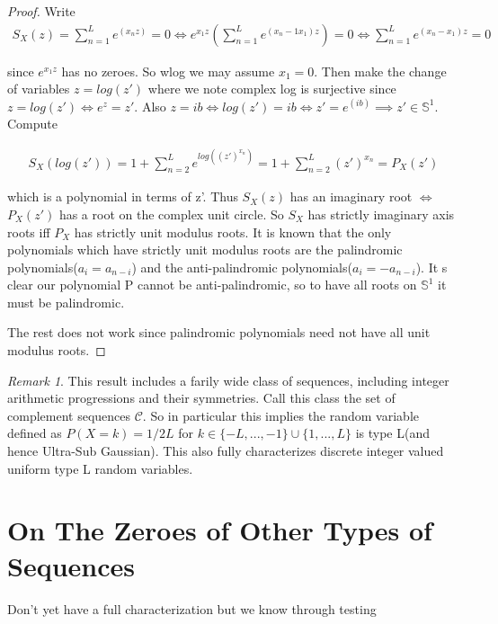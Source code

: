 \documentclass[10pt]{article}
\newcommand{\1}{\textbf{1}}
\theoremstyle{remark}
\newtheorem{remark}[theorem]{Remark}
\theoremstyle{definition}
\begin{document}
\begin{proof}

	Write 
	\begin{align*}
		S_X(z) = \sum_{n=1}^L e^(x_n z) = 0 \iff e^{x_1z}(\sum_{n=1}^L e^{(x_n-1x_1)z}) = 0 \iff \sum_{n=1}^L e^{(x_n-x_1)z} = 0
	\end{align*}

	since $e^{x_1z}$ has no zeroes. So wlog we may assume $x_1 = 0$. Then make the change of variables $z = log(z')$ where we note complex log is surjective 
	since $z = log(z') \iff e^z = z'$. Also $z = ib \iff log(z') = ib \iff z' = e^(ib) \implies z' \in \mathbb{S}^1$. Compute

	\begin{align*}
		S_X(log(z')) = 1 + \sum_{n=2}^L e^{log((z')^{x_n})} = 1 + \sum_{n=2}^L (z')^{x_n} = P_X(z')
	\end{align*}

	which is a polynomial in terms of z'. Thus $S_X(z)$ has an imaginary root $\iff$ $P_X(z')$ has a root on the complex unit circle. So $S_X$ has strictly imaginary axis roots iff $P_X$ has strictly unit modulus roots. It is known that the only polynomials which have strictly unit modulus roots are the palindromic polynomials($a_i = a_{n-i}$) and the anti-palindromic polynomials($a_i = -a_{n-i}$)\cite{MR}. It s clear our polynomial P cannot be anti-palindromic, so to have all roots on $\mathbb{S}^1$ it must be palindromic. 

	The rest does not work since palindromic polynomials need not have all unit modulus roots.

\end{proof}

\begin{remark}
	This result includes a farily wide class of sequences, including integer arithmetic progressions and their symmetries. Call this class the set of complement sequences $\mathcal{C}$. So in particular this implies the random variable defined as $P(X = k) = 1/2L$ for $k \in \{-L,...,-1\} \cup \{1,...,L\}$ is type L(and hence Ultra-Sub Gaussian). This also fully characterizes discrete integer valued uniform type L random variables.
\end{remark}

\section{On The Zeroes of Other Types of Sequences}


Don't yet have a full characterization but we know through testing
\end{document}
